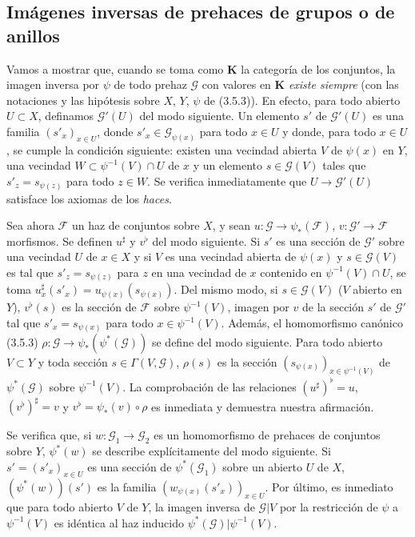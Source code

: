 
\subsection{Imágenes inversas de prehaces de grupos o de anillos}

\begin{env}[3.7.1]
\label{0.3.7.1-fr}
Vamos a mostrar que, cuando se toma como $\boldsymbol{K}$ la categoría de los
conjuntos, la imagen inversa por $\psi$ de todo prehaz $\mathcal{G}$ con
valores en $\boldsymbol{K}$ \emph{existe siempre} (con las notaciones y las
hipótesis sobre $X$, $Y$, $\psi$ de (3.5.3)). En efecto, para todo abierto
$U\subset X$, definamos $\mathcal{G}'(U)$ del modo siguiente. Un elemento $s'$
de $\mathcal{G}'(U)$ es una familia $(s'_x)_{x\in U}$, donde
$s'_x\in\mathcal{G}_{\psi(x)}$ para todo $x\in U$ y donde, para todo $x\in U$,
se cumple la condición siguiente: existen una vecindad abierta $V$ de
$\psi(x)$ en $Y$, una vecindad $W\subset\psi^{-1}(V)\cap U$ de $x$ y un
elemento $s\in\mathcal{G}(V)$ tales que $s'_z=s_{\psi(z)}$ para todo $z\in W$.
Se verifica inmediatamente que $U\to\mathcal{G}'(U)$ satisface los axiomas
de los \emph{haces}.

Sea ahora $\mathcal{F}$ un haz de conjuntos sobre $X$, y sean
$u:\mathcal{G}\to\psi_*(\mathcal{F})$,
$v:\mathcal{G}'\to\mathcal{F}$ morfismos. Se definen $u^\sharp$ y $v^\flat$
del modo siguiente. Si $s'$ es una sección de $\mathcal{G}'$ sobre una vecindad
$U$ de $x\in X$ y si $V$ es una vecindad abierta de $\psi(x)$ y
$s\in\mathcal{G}(V)$ es tal que $s'_z=s_{\psi(z)}$ para $z$ en una vecindad de
$x$ contenido en $\psi^{-1}(V)\cap U$, se toma
$u_x^\sharp(s'_x)=u_{\psi(x)}(s_{\psi(x)})$. Del mismo modo, si
$s\in\mathcal{G}(V)$ ($V$ abierto en $Y$), $v^\flat(s)$ es la sección de
$\mathcal{F}$ sobre $\psi^{-1}(V)$, imagen por $v$ de la sección $s'$ de
$\mathcal{G}'$ tal que $s'_x=s_{\psi(x)}$ para todo $x\in\psi^{-1}(V)$.
Además, el homomorfismo canónico (3.5.3)
$\rho:\mathcal{G}\to\psi_*(\psi^*(\mathcal{G}))$ se define del modo siguiente.
Para todo abierto $V\subset Y$ y toda sección $s\in\Gamma(V,\mathcal{G})$,
$\rho(s)$ es la sección $(s_{\psi(x)})_{x\in\psi^{-1}(V)}$ de
$\psi^*(\mathcal{G})$ sobre $\psi^{-1}(V)$. La comprobación de las relaciones
$(u^\sharp)^\flat=u$, $(v^\flat)^\sharp=v$ y $v^\flat=\psi_*(v)\circ\rho$
es inmediata y demuestra nuestra afirmación.

Se verifica que, si $w:\mathcal{G}_1\to\mathcal{G}_2$ es un homomorfismo de
prehaces de conjuntos sobre $Y$, $\psi^*(w)$ se describe explícitamente del
modo siguiente. Si $s'=(s'_x)_{x\in U}$ es una sección de
$\psi^*(\mathcal{G}_1)$ sobre un abierto $U$ de $X$, $(\psi^*(w))(s')$ es
la familia $(w_{\psi(x)}(s'_x))_{x\in U}$. Por último, es inmediato que para
todo abierto $V$ de $Y$, la imagen inversa de $\mathcal{G}|V$ por la
restricción de $\psi$ a $\psi^{-1}(V)$ es idéntica al haz inducido
$\psi^*(\mathcal{G})|\psi^{-1}(V)$.


\end{env}
